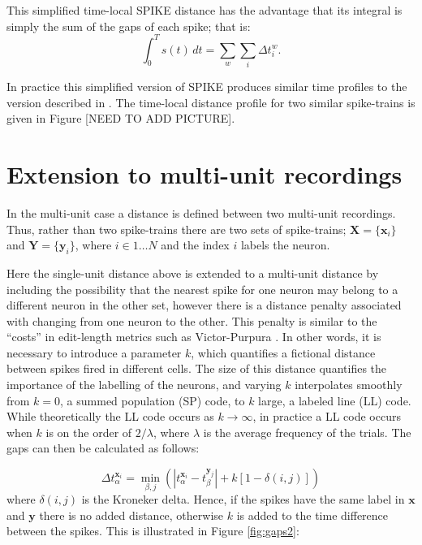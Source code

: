 This simplified time-local SPIKE distance has the advantage that its integral is simply the sum of the gaps of each spike; that is:
\begin{equation}
\int_0^T s(t)\, dt = \sum_w \sum_i \Delta t_i^w.
\end{equation}

In practice this simplified version of SPIKE produces similar time profiles to the version described in \cite{Kreuzetal2011}. The time-local distance profile for two similar spike-trains is given in Figure [NEED TO ADD PICTURE].

\section{Extension to multi-unit recordings}

In the multi-unit case a distance is defined between two multi-unit recordings.  Thus, rather than two spike-trains there are two sets of spike-trains; $\mathbf{X}=\{ \mathbf{x}_i \}$ and $ \mathbf{Y}=\{ \mathbf{y}_i \}$, where $i \in 1\ldots N$ and the index $i$ labels the neuron.

Here the single-unit distance above is extended to a multi-unit distance by including the possibility that the nearest spike for one neuron may belong to a different neuron in the other set, however there is a distance penalty associated with changing from one neuron to the other. This penalty is similar to the ``costs'' in edit-length metrics such as Victor-Purpura \cite{VictorPurpura1997}. In other words, it is necessary to introduce a parameter $k$, which quantifies a fictional distance between spikes fired in different cells.  The size of this distance quantifies the importance of the labelling of the neurons, and varying $k$ interpolates smoothly from $k=0$, a summed population (SP) code, to $k$ large, a labeled line  (LL) code.  While theoretically the LL code occurs as $k \rightarrow \infty$, in practice a LL code occurs when $k$ is on the order of $2/\lambda$, where $\lambda$ is the average frequency of the trials.   The gaps can then be calculated as follows:

\begin{equation}
\Delta t_{\alpha}^{\mathbf{x}_i} = \min_{\beta,j} \left( |t_{\alpha}^{\mathbf{x}_i} - t_{\beta}^{\mathbf{y}_j} | + k\left[1-\delta(i,j)\right] \right)
\end{equation}
where $\delta(i,j)$ is the Kroneker delta. Hence, if the spikes have the same label in $\mathbf{x}$ and $\mathbf{y}$ there is no added distance, otherwise $k$ is added to the time difference between the spikes.  This is illustrated in Figure \ref{fig:gaps2}:

